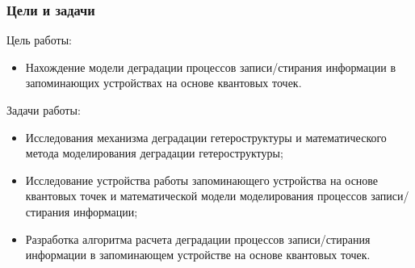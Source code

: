 \documentclass[10pt,pdf,hyperref={unicode},aspectratio={169}]{beamer}
\begin{document}
\begin{frame}
	\frametitle{Цели и задачи}
	Цель работы:
	\begin{itemize}
		\item Нахождение модели деградации процессов записи/стирания информации в запоминающих устройствах на основе квантовых точек.
	\end{itemize}
	Задачи работы:
	\begin{itemize}
		\item Исследования механизма деградации гетероструктуры и математического метода моделирования деградации гетероструктуры;
		\item Исследование устройства работы запоминающего устройства на основе квантовых точек и математической модели моделирования процессов записи/стирания информации;
		\item Разработка алгоритма расчета деградации процессов записи/стирания информации в запоминающем устройстве на основе квантовых точек.
	\end{itemize}
\end{frame}
\end{document}
